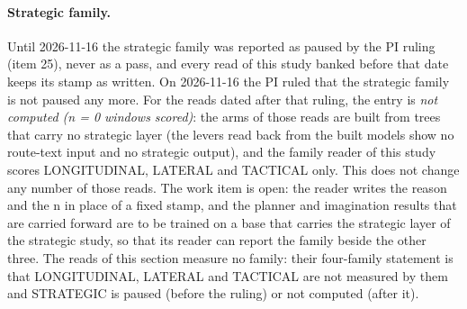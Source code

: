 \label{sec:fam7}
\paragraph{Strategic family.} Until 2026-11-16 the strategic family was reported as paused by the PI ruling (item 25), never as a pass, and every read of this study banked before that date keeps its stamp as written. On 2026-11-16 the PI ruled that the strategic family is not paused any more. For the reads dated after that ruling, the entry is \emph{not computed (n = 0 windows scored)}: the arms of those reads are built from trees that carry no strategic layer (the levers read back from the built models show no route-text input and no strategic output), and the family reader of this study scores LONGITUDINAL, LATERAL and TACTICAL only. This does not change any number of those reads. The work item is open: the reader writes the reason and the n in place of a fixed stamp, and the planner and imagination results that are carried forward are to be trained on a base that carries the strategic layer of the strategic study, so that its reader can report the family beside the other three. The  reads of this section measure no family: their four-family statement is that LONGITUDINAL, LATERAL and TACTICAL are not measured by them and STRATEGIC is paused (before the ruling) or not computed (after it).

